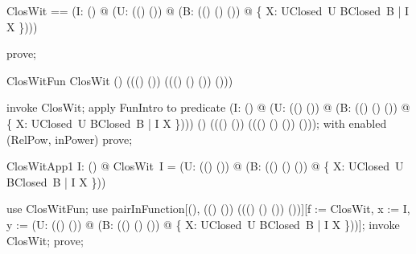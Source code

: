 \documentclass{article}
\begin{document}
\begin{zed}
  ClosWit == (\lambda I: \power (\nat \fun \nat) @ (\lambda U: \power ((\nat \fun \nat) \fun (\nat \fun \nat)) @ (\lambda B: \power ((\nat \fun \nat) \cross (\nat \fun \nat) \fun (\nat \fun \nat)) @ \bigcap \{ X: UClosed~U \cap BClosed~B | I \subseteq X \})))
\end{zed}

\begin{zproof}
prove;
\end{zproof}

\begin{theorem}{ClosWitFun}
  ClosWit \in \power (\nat \fun \nat) \fun (\power ((\nat \fun \nat) \fun (\nat \fun \nat)) \fun (\power ((\nat \fun \nat) \cross (\nat \fun \nat) \fun (\nat \fun \nat)) \fun \power (\nat \fun \nat)))
\end{theorem}

\begin{zproof}
invoke ClosWit;
apply FunIntro to predicate (\lambda I: \power (\nat \fun \nat) @ (\lambda U: \power ((\nat \fun \nat) \fun (\nat \fun \nat)) @ (\lambda B: \power ((\nat \fun \nat) \cross (\nat \fun \nat) \fun (\nat \fun \nat)) @ \bigcap \{ X: UClosed~U \cap BClosed~B | I \subseteq X \}))) \in \power (\nat \fun \nat) \fun (\power ((\nat \fun \nat) \fun (\nat \fun \nat)) \fun (\power ((\nat \fun \nat) \cross (\nat \fun \nat) \fun (\nat \fun \nat)) \fun \power (\nat \fun \nat)));
with enabled (RelPow, inPower) prove;
\end{zproof}

\begin{theorem}{ClosWitApp1}
  \forall I: \power (\nat \fun \nat) @ ClosWit~I = (\lambda U: \power ((\nat \fun \nat) \fun (\nat \fun \nat)) @ (\lambda B: \power ((\nat \fun \nat) \cross (\nat \fun \nat) \fun (\nat \fun \nat)) @ \bigcap \{ X: UClosed~U \cap BClosed~B | I \subseteq X \}))
\end{theorem}

\begin{zproof}
use ClosWitFun;
use pairInFunction[\power (\nat \fun \nat), \power ((\nat \fun \nat) \fun (\nat \fun \nat)) \fun (\power ((\nat \fun \nat) \cross (\nat \fun \nat) \fun (\nat \fun \nat)) \fun \power (\nat \fun \nat))][f := ClosWit, x := I, y := (\lambda U: \power ((\nat \fun \nat) \fun (\nat \fun \nat)) @ (\lambda B: \power ((\nat \fun \nat) \cross (\nat \fun \nat) \fun (\nat \fun \nat)) @ \bigcap \{ X: UClosed~U \cap BClosed~B | I \subseteq X \}))];
invoke ClosWit;
prove;
\end{zproof}
\end{document}
